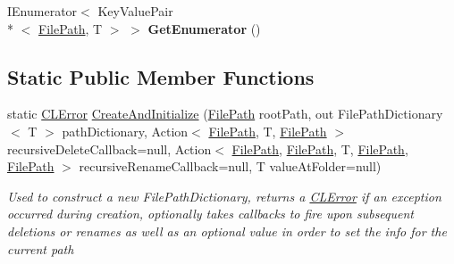 \begin{DoxyCompactItemize}
\item 
\hypertarget{class_cloud_api_public_1_1_model_1_1_file_path_dictionary_3_01_t_01_4_a770fe08003857f72d97f82f722d718a8}{I\-Enumerator$<$ Key\-Value\-Pair\\*
$<$ \hyperlink{class_cloud_api_public_1_1_model_1_1_file_path}{File\-Path}, T $>$ $>$ {\bfseries Get\-Enumerator} ()}\label{class_cloud_api_public_1_1_model_1_1_file_path_dictionary_3_01_t_01_4_a770fe08003857f72d97f82f722d718a8}

\end{DoxyCompactItemize}
\subsection*{Static Public Member Functions}
\begin{DoxyCompactItemize}
\item 
static \hyperlink{class_cloud_api_public_1_1_model_1_1_c_l_error}{C\-L\-Error} \hyperlink{class_cloud_api_public_1_1_model_1_1_file_path_dictionary_3_01_t_01_4_a56e73d1ac059528b55a32fdfc0a5f0bc}{Create\-And\-Initialize} (\hyperlink{class_cloud_api_public_1_1_model_1_1_file_path}{File\-Path} root\-Path, out File\-Path\-Dictionary$<$ T $>$ path\-Dictionary, Action$<$ \hyperlink{class_cloud_api_public_1_1_model_1_1_file_path}{File\-Path}, T, \hyperlink{class_cloud_api_public_1_1_model_1_1_file_path}{File\-Path} $>$ recursive\-Delete\-Callback=null, Action$<$ \hyperlink{class_cloud_api_public_1_1_model_1_1_file_path}{File\-Path}, \hyperlink{class_cloud_api_public_1_1_model_1_1_file_path}{File\-Path}, T, \hyperlink{class_cloud_api_public_1_1_model_1_1_file_path}{File\-Path}, \hyperlink{class_cloud_api_public_1_1_model_1_1_file_path}{File\-Path} $>$ recursive\-Rename\-Callback=null, T value\-At\-Folder=null)
\begin{DoxyCompactList}\small\item\em Used to construct a new File\-Path\-Dictionary, returns a \hyperlink{class_cloud_api_public_1_1_model_1_1_c_l_error}{C\-L\-Error} if an exception occurred during creation, optionally takes callbacks to fire upon subsequent deletions or renames as well as an optional value in order to set the info for the current path \end{DoxyCompactList}\end{DoxyCompactItemize}
